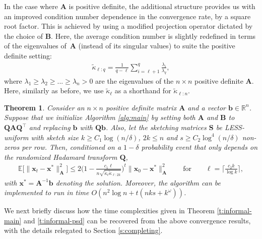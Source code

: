 \documentclass[11pt]{article}
\let\origtop\top
\renewcommand\top{{\scriptscriptstyle{\origtop}}}
\def\x{{\mathbf x}}
\def\b{{\mathbf b}}
\def\A{{\mathbf A}}
\def\B{{\mathbf B}}
\def\Q{{\mathbf Q}}
\def\S{{\mathbf S}}
\def\E{{\mathds E}}
\def\R{{\mathbf R}}
\def\R{{\mathds R}}
\newtheorem{thm}{Theorem}
\begin{document}
In the case where $\A$ is positive definite, the additional structure provides us with an improved condition number dependence in the convergence rate, by a square root factor. This is achieved by using a modified projection operator dictated by the choice of $\B$. Here, the average condition number is slightly redefined in terms of the eigenvalues of~$\A$ (instead of its singular values) to suite the positive definite setting:
\begin{align*}
    \tilde\kappa_{\ell:q} =\frac1{q-\ell}\sum_{i=\ell+1}^q\frac{\lambda_i}{\lambda_q},
\end{align*}
where $\lambda_1\geq\lambda_2\geq ...\geq \lambda_n>0$ are the eigenvalues of the $n\times n$ positive definite $\A$. Here, similarly as before, we use $\tilde\kappa_\ell$ as a shorthand for $\tilde\kappa_{\ell:n}$.
\begin{thm}\label{thm:psd}
Consider an $n\times n$ positive definite matrix $\A$ and a vector $\b\in\R^n$. Suppose that we initialize Algorithm \ref{alg:main} by setting both $\A$ and $\B$ to $\Q\A\Q^\top$ and replacing $\b$ with $\Q\b$. Also, let the sketching matrices $\S$ be LESS-uniform with sketch size $k\geq C_1\log(n/\delta)$, $2k \leq n$ and $s\geq C_2\log^4(n/\delta)$ non-zeros per row. Then, conditioned on a $1-\delta$ probability event that only depends on the randomized Hadamard transform $\Q$,
    \begin{align*}
        \E\big[\|\x_t-\x^*\|_{\A}^2\big]\leq 2\Big(1- \frac{c_1 \ell}{n\sqrt{\tilde\kappa_{\ell}\tilde\kappa_{\ell:2k}}}\Big)^t\|\x_0-\x^*\|_{\A}^2\qquad\text{for}\qquad \ell= \Big\lceil\frac {c_2k}{\log k}\Big\rceil,
    \end{align*}
    with $\x^*=\A^{-1}\b$ denoting the solution. Moreover, the algorithm can be implemented to run in time $O(n^2\log n + t(nks + k^\omega))$.
\end{thm}
We next briefly discuss how the time complexities given in Theorem \ref{t:informal-main} and \ref{t:informal-psd} can be recovered from the above convergence results, with the details relegated to Section \ref{s:completing}.
\end{document}
